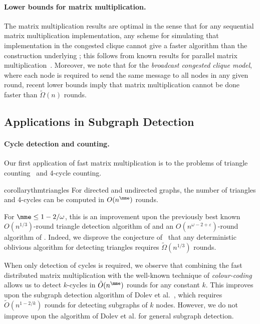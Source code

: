 \paragraph{Lower bounds for matrix multiplication.}
The matrix multiplication results are optimal in the sense that for any sequential matrix multiplication implementation, any scheme for simulating that implementation in the congested clique cannot give a faster algorithm than the construction underlying ; this follows from known results for parallel matrix multiplication~\cite{BallardDHS12_strassen_lower, IronyTT04_3d_lower,AggarwalCS90_PRAM,tiskin1998}. Moreover, we note that for the \emph{broadcast congested clique model}, where each node is required to send the same message to all nodes in any given round, recent lower bounds \cite{arXiv:1412.3445} imply that matrix multiplication cannot be done faster than $\tilde\Omega(n)$ rounds. 


\subsection{Applications in Subgraph Detection}

\paragraph{Cycle detection and counting.}
Our first application of fast matrix multiplication is to the problems of triangle counting~\cite{itai1978finding} and 4-cycle counting. 

\begin{restatable}{corollary}{thmtriangles}\label{cor:triangles}
    For directed and undirected graphs, the number of triangles and 4-cycles can be computed in $O(n^{\mme})$ rounds.
\end{restatable}

For $\mme \le 1-2/\omega$, this is an improvement upon the previously best known $O(n^{1/3})$-round triangle detection algorithm of \citet{tritri} and an $O(n^{\omega - 2 + \varepsilon})$-round algorithm of \citet{drucker13}. Indeed, we disprove the conjecture of~\citet{tritri} that any deterministic oblivious algorithm for detecting triangles requires $\tilde{\Omega}(n^{1/3})$ rounds.

When only detection of cycles is required, we observe that combining the fast distributed matrix multiplication with the well-known technique of \emph{colour-coding} \cite{alon1995color} allows us to detect $k$-cycles in $\tilde{O}(n^{\mme})$ rounds for any constant $k$. This improves upon the subgraph detection algorithm of Dolev et al.~\cite{tritri}, which requires $\tilde{O}(n^{1-2/k})$ rounds for detecting subgraphs of $k$ nodes. However, we do not improve upon the algorithm of Dolev et al. for general subgraph detection.

